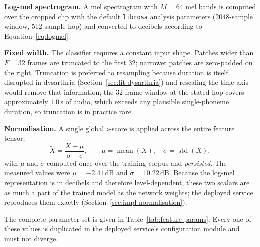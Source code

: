 \textbf{Log-mel spectrogram.} A mel spectrogram with $M = 64$ mel bands is
computed over the cropped clip with the default \texttt{librosa} analysis
parameters (2048-sample window, 512-sample hop) and converted to decibels
according to Equation~\eqref{eq:logmel}.

\textbf{Fixed width.} The classifier requires a constant input shape. Patches
wider than $F = 32$ frames are truncated to the first 32; narrower patches are
zero-padded on the right. Truncation is preferred to resampling because
duration is itself disrupted in dysarthria
(Section~\ref{sec:lit-dysarthria}) and rescaling the time axis would remove
that information; the 32-frame window at the stated hop covers approximately
$1.0$\,s of audio, which exceeds any plausible single-phoneme duration, so
truncation is in practice rare.

\textbf{Normalisation.} A single global $z$-score is applied across the entire
feature tensor,
\begin{equation}
\tilde{X} = \frac{X - \mu}{\sigma + \epsilon},
\qquad
\mu = \operatorname{mean}(X),\quad \sigma = \operatorname{std}(X),
\label{eq:zscore}
\end{equation}
with $\mu$ and $\sigma$ computed once over the training corpus and
\emph{persisted}. The measured values were $\mu = -2.41$\,dB and
$\sigma = 10.22$\,dB. Because the log-mel representation is in decibels and
therefore level-dependent, these two scalars are as much a part of the trained
model as the network weights; the deployed service reproduces them exactly
(Section~\ref{sec:impl-normalisation}).

The complete parameter set is given in Table~\ref{tab:feature-params}. Every one
of these values is duplicated in the deployed service's configuration module and
must not diverge.

